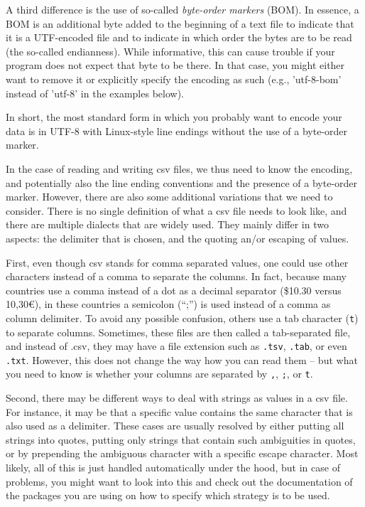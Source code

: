 A third difference is the use of so-called \emph{byte-order markers} (BOM). In essence, a BOM is an additional byte added to the beginning of a text file to indicate that it is a UTF-encoded file and to indicate in which order the bytes are to be read (the so-called endianness). While informative, this can cause trouble if your program does not expect that byte to be there. In that case, you might either want to remove it or explicitly specify the encoding as such (e.g., 'utf-8-bom' instead of 'utf-8' in the examples below).


In short, the most standard form in which you probably want to encode your data is in UTF-8 with Linux-style line endings without the use of a byte-order marker.


In the case of reading and writing csv files, we thus need to know the encoding, and potentially also the line ending conventions and the presence of a byte-order marker. However, there are also some additional variations that we need to consider. There is no single definition of what a csv file needs to look like, and there are multiple dialects that are widely used. They mainly differ in two aspects: the delimiter that is chosen, and the quoting an/or escaping of values.

First, even though csv stands for comma separated values, one could use other characters instead of a comma to separate the columns. In fact, because many countries use a comma instead of a dot  as a decimal separator (\$10.30 versus 10,30€), in these countries a semicolon (``;'') is used instead of a comma as  column delimiter.
To avoid any possible confusion, others use a tab character (\verb+t+) to separate columns.
Sometimes, these files are then called a tab-separated file, and instead of .csv,
they may have a file extension such as \verb|.tsv|, \verb|.tab|, or even \verb|.txt|.
However, this does not change the way how you can read them -- but what you need to know is whether your columns are separated by
\texttt{,}, \texttt{;}, or \verb|t|.

Second, there may be different ways  to deal with strings as values in a csv file. For instance, it may be that a specific value contains the same character that is also used as a delimiter. These cases are usually resolved by either putting all strings into quotes, putting only strings that contain such ambiguities in quotes, or by prepending the ambiguous character with a specific escape character. Most likely, all of this is just handled automatically under the hood, but in case of problems, you might want to look into this and check out the documentation of the packages you are using on how to specify which strategy is to be used.

